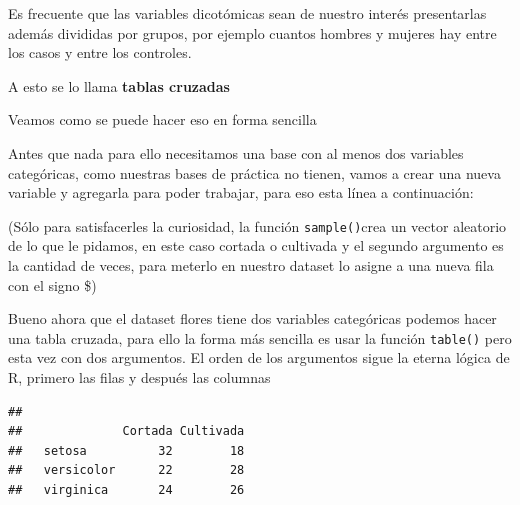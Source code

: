 \documentclass[
]{book}
\newenvironment{Shaded}{\begin{snugshade}}{\end{snugshade}}
\newcommand{\AttributeTok}[1]{\textcolor[rgb]{0.77,0.63,0.00}{#1}}
\newcommand{\ConstantTok}[1]{\textcolor[rgb]{0.00,0.00,0.00}{#1}}
\newcommand{\DecValTok}[1]{\textcolor[rgb]{0.00,0.00,0.81}{#1}}
\newcommand{\FunctionTok}[1]{\textcolor[rgb]{0.00,0.00,0.00}{#1}}
\newcommand{\NormalTok}[1]{#1}
\newcommand{\OtherTok}[1]{\textcolor[rgb]{0.56,0.35,0.01}{#1}}
\newcommand{\SpecialCharTok}[1]{\textcolor[rgb]{0.00,0.00,0.00}{#1}}
\newcommand{\StringTok}[1]{\textcolor[rgb]{0.31,0.60,0.02}{#1}}
\begin{document}
Es frecuente que las variables dicotómicas sean de nuestro interés presentarlas además divididas por grupos, por ejemplo cuantos hombres y mujeres hay entre los casos y entre los controles.

A esto se lo llama \textbf{tablas cruzadas}

Veamos como se puede hacer eso en forma sencilla

Antes que nada para ello necesitamos una base con al menos dos variables categóricas, como nuestras bases de práctica no tienen, vamos a crear una nueva variable y agregarla para poder trabajar, para eso esta línea a continuación:

\begin{Shaded}
\end{Shaded}

(Sólo para satisfacerles la curiosidad, la función \texttt{sample()}crea un vector aleatorio de lo que le pidamos, en este caso cortada o cultivada y el segundo argumento es la cantidad de veces, para meterlo en nuestro dataset lo asigne a una nueva fila con el signo \$)

Bueno ahora que el dataset flores tiene dos variables categóricas podemos hacer una tabla cruzada, para ello la forma más sencilla es usar la función \texttt{table()} pero esta vez con dos argumentos. El orden de los argumentos sigue la eterna lógica de R, primero las filas y después las columnas

\begin{Shaded}
\end{Shaded}

\begin{verbatim}
##             
##              Cortada Cultivada
##   setosa          32        18
##   versicolor      22        28
##   virginica       24        26
\end{verbatim}
\end{document}
